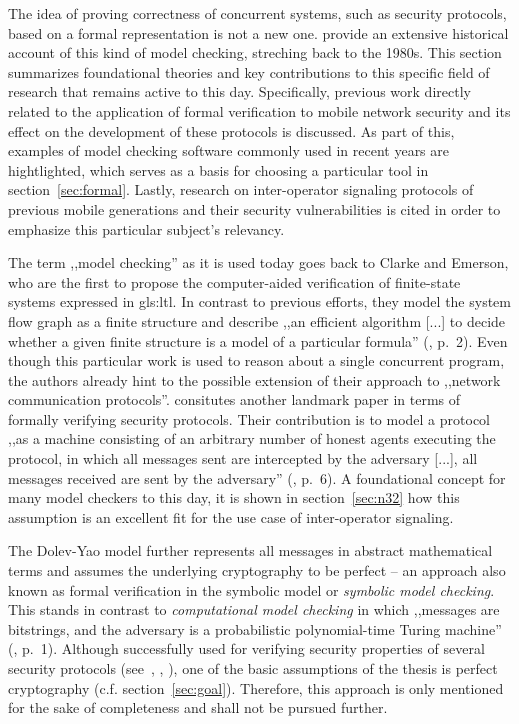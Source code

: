 The idea of proving correctness of concurrent systems, such as security protocols, based on a formal representation is not a new one.
\cite{basin2018model} provide an extensive historical account of this kind of model checking, streching back to the 1980s.
This section summarizes foundational theories and key contributions to this specific field of research that remains active to this day.
Specifically, previous work directly related to the application of formal verification to mobile network security and its effect on the development of these protocols is discussed.
As part of this, examples of model checking software commonly used in recent years are hightlighted, which serves as a basis for choosing a particular tool in section~\ref{sec:formal}.
Lastly, research on inter-operator signaling protocols of previous mobile generations and their security vulnerabilities is cited in order to emphasize this particular subject's relevancy.

The term ,,model checking'' as it is used today goes back to Clarke and Emerson, who are the first to propose the computer-aided verification of finite-state systems expressed in \gls{gls:ltl}.
In contrast to previous efforts, they model the system flow graph as a finite structure and describe ,,an efficient algorithm [...] to decide whether a given finite structure is a model of a particular formula'' (\cite{clarke1981design}, p.~2).
Even though this particular work is used to reason about a single concurrent program, the authors already hint to the possible extension of their approach to ,,network communication protocols''.
\cite{dolev1983security} consitutes another landmark paper in terms of formally verifying security protocols.
Their contribution is to model a protocol ,,as a machine consisting of an arbitrary number of honest agents executing the protocol, in which all messages sent are intercepted by the adversary [...], all messages received are sent by the adversary'' (\cite{basin2018model}, p.~6).
A foundational concept for many model checkers to this day, it is shown in section~\ref{sec:n32} how this assumption is an excellent fit for the use case of inter-operator signaling.

The Dolev-Yao model further represents all messages in abstract mathematical terms and assumes the underlying cryptography to be perfect -- an approach also known as formal verification in the symbolic model or \textit{symbolic model checking}.
This stands in contrast to \textit{computational model checking} in which ,,messages are bitstrings, and the adversary is a probabilistic polynomial-time Turing machine'' (\cite{blanchet2008computationally}, p.~1).
Although successfully used for verifying security properties of several security protocols (see~\cite{BlanchetJaggardScedrovTsayAsiaCCS08}, \cite{CadeBlanchetJoWUA13}, \cite{LippBlanchetBhargavanEuroSP19}), one of the basic assumptions of the thesis is perfect cryptography (c.f. section~\ref{sec:goal}).
Therefore, this approach is only mentioned for the sake of completeness and shall not be pursued further.\medskip

